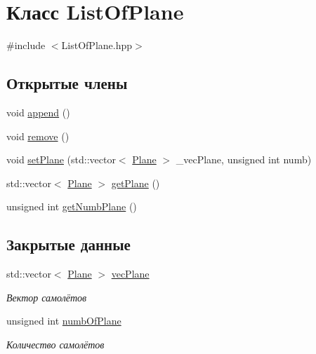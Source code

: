 \hypertarget{class_list_of_plane}{}\section{Класс List\+Of\+Plane}
\label{class_list_of_plane}


{\ttfamily \#include $<$List\+Of\+Plane.\+hpp$>$}

\subsection*{Открытые члены}
\begin{DoxyCompactItemize}
\item 
void \hyperlink{class_list_of_plane_a2b81c90c669c5fdf8e6a053c6aaafb8e}{append} ()
\item 
void \hyperlink{class_list_of_plane_a152cb12549cee25fefbe75159e318157}{remove} ()
\item 
void \hyperlink{class_list_of_plane_a9dadb413d0ee5536217a19e34f2bb757}{set\+Plane} (std\+::vector$<$ \hyperlink{class_plane}{Plane} $>$ \+\_\+vec\+Plane, unsigned int numb)
\item 
std\+::vector$<$ \hyperlink{class_plane}{Plane} $>$ \hyperlink{class_list_of_plane_a7f5eee1489cc100da8d3df6a80652553}{get\+Plane} ()
\item 
unsigned int \hyperlink{class_list_of_plane_aa21a469804729aeef61df98cce0c9ebd}{get\+Numb\+Plane} ()
\end{DoxyCompactItemize}
\subsection*{Закрытые данные}
\begin{DoxyCompactItemize}
\item 
std\+::vector$<$ \hyperlink{class_plane}{Plane} $>$ \hyperlink{class_list_of_plane_a83564d3342c3c10cc601f8512169f15c}{vec\+Plane}
\begin{DoxyCompactList}\small\item\em Вектор самолётов \end{DoxyCompactList}\item 
unsigned int \hyperlink{class_list_of_plane_ae9be7e0a6c59b6d81b3ab1481d97b7c3}{numb\+Of\+Plane}
\begin{DoxyCompactList}\small\item\em Количество самолётов \end{DoxyCompactList}\end{DoxyCompactItemize}


